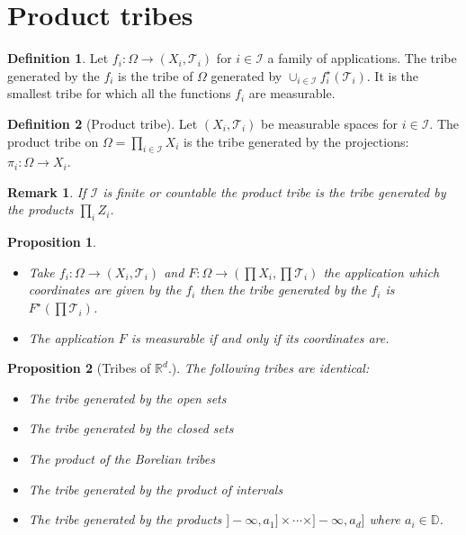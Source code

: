 \documentclass[10pt,a4paper]{book}
\newtheorem{proposition}{Proposition}[section]
\newtheorem*{remark}{Remark}
\theoremstyle{definition}
\newtheorem{definition}{Definition}[section]
\begin{document}
\section{Product tribes}

\begin{definition}

Let $f_i : \Omega \to (X_i, \mathcal{T}_i)$ for $i \in \mathcal{I}$ a family of applications. The tribe generated by the $f_i$ is the tribe of $\Omega$ generated by $\cup_{i \in \mathcal{I}} f_i^\star (\mathcal{T}_i)$.  It is the smallest tribe for which all the functions $f_i$ are measurable.

\end{definition}

\begin{definition}[Product tribe]
Let $(X_i, \mathcal{T}_i)$ be measurable spaces for $i \in \mathcal{I}$. The product tribe on $\Omega = \prod_{i \in \mathcal{I}} X_i$ is the tribe generated by the projections: $\pi_i : \Omega \to X_i$.
\end{definition}

\begin{remark}
If $\mathcal{I}$ is finite or countable the product tribe is the tribe generated by the products $\prod_i Z_i$.
\end{remark}

\begin{proposition}
\begin{itemize}
\item Take $f_i : \Omega \to (X_i, \mathcal{T}_i)$ and $F : \Omega \to (\prod X_i ,\prod \mathcal{T}_i)$ the application which coordinates are given by the $f_i$ then the tribe generated by the $f_i$ is $F^\star (\prod \mathcal{T}_i)$. 
\item The application $F$ is measurable if and only if its coordinates are.
\end{itemize}
\end{proposition}

\begin{proposition} [Tribes of $\mathbb{R}^d$.] 
The following tribes are identical:
\begin{itemize}

\item The tribe generated by the open sets
\item The tribe generated by the closed sets
\item The product of the Borelian tribes
\item The tribe generated by the product of intervals
\item The tribe generated by the products $]-\infty, a_1] \times \cdots \times ]-\infty, a_d]$ where $a_i \in \mathbb{D}$.

\end{itemize}
\end{proposition}
\end{document}
